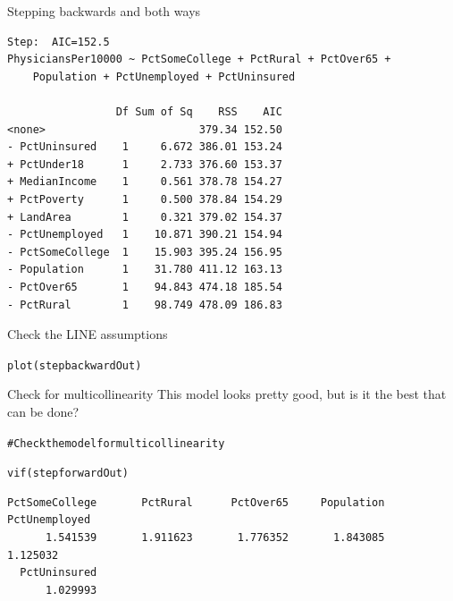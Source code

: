 \documentclass{beamer}\usepackage[]{graphicx}\usepackage[]{color}
\makeatletter
\newcommand{\hlcom}[1]{\textcolor[rgb]{0.824,0.706,0.549}{#1}}%
\newcommand{\hlstd}[1]{\textcolor[rgb]{1,0.894,0.769}{#1}}%
\newcommand{\hlkwd}[1]{\textcolor[rgb]{1,0.78,0.769}{#1}}%
\newenvironment{kframe}{%
 \def\at@end@of@kframe{}%
 \ifinner\ifhmode%
  \def\at@end@of@kframe{\end{minipage}}%
  \begin{minipage}{\columnwidth}%
 \fi\fi%
 \def\FrameCommand##1{\hskip\@totalleftmargin \hskip-\fboxsep
 \colorbox{shadecolor}{##1}\hskip-\fboxsep
     \hskip-\linewidth \hskip-\@totalleftmargin \hskip\columnwidth}%
 \MakeFramed {\advance\hsize-\width
   \@totalleftmargin\z@ \linewidth\hsize
   \@setminipage}}%
 {\par\unskip\endMakeFramed%
 \at@end@of@kframe}
\newenvironment{knitrout}{}{} %
\makeatother
\begin{document}
\begin{darkframes}
\begin{frame}[fragile]{Stepping backwards and both ways}
\begin{knitrout}
\begin{kframe}
\begin{verbatim}
Step:  AIC=152.5
PhysiciansPer10000 ~ PctSomeCollege + PctRural + PctOver65 + 
    Population + PctUnemployed + PctUninsured

                 Df Sum of Sq    RSS    AIC
<none>                        379.34 152.50
- PctUninsured    1     6.672 386.01 153.24
+ PctUnder18      1     2.733 376.60 153.37
+ MedianIncome    1     0.561 378.78 154.27
+ PctPoverty      1     0.500 378.84 154.29
+ LandArea        1     0.321 379.02 154.37
- PctUnemployed   1    10.871 390.21 154.94
- PctSomeCollege  1    15.903 395.24 156.95
- Population      1    31.780 411.12 163.13
- PctOver65       1    94.843 474.18 185.54
- PctRural        1    98.749 478.09 186.83
\end{verbatim}
\end{kframe}
\end{knitrout}

      \lc
    \end{frame}


    \begin{frame}[fragile]{Check the LINE assumptions}
      \fontsize{8}{8}\selectfont

\begin{knitrout}
\begin{kframe}
\begin{alltt}
\hlkwd{plot}\hlstd{(stepbackwardOut)}
\end{alltt}


{\ttfamily\noindent\itshape\color{messagecolor}{hat values (leverages) are all = 0.006369427\\ and there are no factor predictors; no plot no. 5}}\end{kframe}


\end{knitrout}

    \end{frame}


    \begin{frame}[fragile]{Check for multicollinearity}
     This model looks pretty good, but is it the best that can be done?
    \fontsize{8}{8}\selectfont
\begin{knitrout}
\begin{kframe}
\begin{alltt}
\hlcom{# Check the model for multicollinearity}

\hlkwd{vif}\hlstd{(stepforwardOut)}
\end{alltt}
\begin{verbatim}
PctSomeCollege       PctRural      PctOver65     Population  PctUnemployed 
      1.541539       1.911623       1.776352       1.843085       1.125032 
  PctUninsured 
      1.029993 
\end{verbatim}
\end{kframe}
\end{knitrout}


\end{frame}
\end{darkframes}
\end{document}
